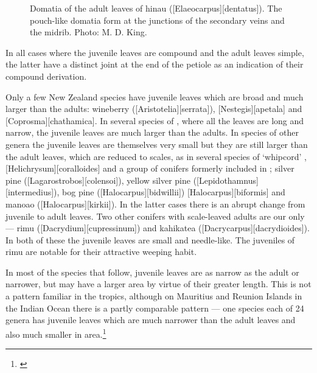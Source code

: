 \begin{figure}[htb]
\begin{minipage}[t]{0.475\textwidth}
    	\caption[Domatia of the adult leaves of hinau]{Domatia of the adult leaves of hinau ([Elaeocarpus][dentatus]).
        The pouch-like domatia form at the junctions of the secondary veins and the midrib.
    	Photo: M. D. King.}%
    	\label{fig:23hinau}
	\end{minipage}
\end{figure}

In all cases where the juvenile leaves are compound and the adult leaves simple, the latter have a distinct joint at the end of the petiole as an indication of their compound derivation.

Only a few New Zealand species have juvenile leaves which are broad and much larger than the adults: wineberry ([Aristotelia][serrata]), [Nestegis][apetala] and [Coprosma][chathamica].
In several species of , where all the leaves are long and narrow, the juvenile leaves are much larger than the adults.
In species of other genera the juvenile leaves are themselves very small but they are still larger than the adult leaves, which are reduced to scales, as in several species of `whipcord' , [Helichrysum][coralloides] and a group of conifers formerly included in ; silver pine ([Lagarostrobos][colensoi]), yellow silver pine ([Lepidothamnus][intermedius]), bog pine ([Halocarpus][bidwillii]) [Halocarpus][biformis] and manoao ([Halocarpus][kirkii]).
In the latter cases there is an abrupt change from juvenile to adult leaves.
Two other conifers with scale-leaved adults are our only  --- rimu ([Dacrydium][cupressinum]) and kahikatea ([Dacrycarpus][dacrydioides]).
In both of these the juvenile leaves are small and needle-like.
The juveniles of rimu are notable for their attractive weeping habit.

In most of the species that follow, juvenile leaves are as narrow as the adult or narrower, but may have a larger area by virtue of their greater length.
This is not a pattern familiar in the tropics, although on Mauritius and Reunion Islands in the Indian Ocean there is a partly comparable pattern --- one species each of 24 genera has juvenile leaves which are much narrower than the adult leaves and also much smaller in area.\footnote{\cite{friedmann1976observations}}

